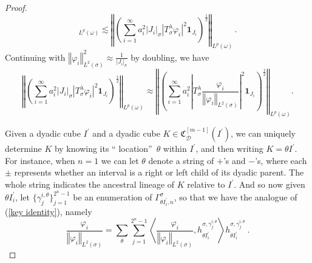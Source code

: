 \documentclass{amsart}%
\theoremstyle{plain}
\numberwithin{equation}{section}
\begin{document}
\begin{proof}
\[_{L^{p}\left(  \omega\right)  }\lesssim\left\Vert \left(  \sum_{i=1}^{\infty
}a_{i}^{2}\left\vert J_{i}\right\vert _{\sigma}\left\vert T_{\sigma}^{\lambda
}\varphi_{i}\right\vert ^{2}\mathbf{1}_{J_{i}}\right)  ^{\frac{1}{2}%
}\right\Vert _{L^{p}\left(  \omega\right)  }\,.
\]
Continuing with $\left\Vert \varphi_{i}\right\Vert _{L^{2}\left(
\sigma\right)  }^{2}\approx\frac{1}{\left\vert J_{i}\right\vert _{\sigma}}$ by
doubling, we have%
\[
\left\Vert \left(  \sum_{i=1}^{\infty}a_{i}^{2}\left\vert J_{i}\right\vert
_{\sigma}\left\vert T_{\sigma}^{\lambda}\varphi_{i}\right\vert ^{2}%
\mathbf{1}_{J_{i}}\right)  ^{\frac{1}{2}}\right\Vert _{L^{p}\left(
\omega\right)  }\approx\left\Vert \left(  \sum_{i=1}^{\infty}a_{i}%
^{2}\left\vert T_{\sigma}^{\lambda}\frac{\varphi_{i}}{\left\Vert \varphi
_{i}\right\Vert _{L^{2}\left(  \sigma\right)  }}\right\vert ^{2}%
\mathbf{1}_{J_{i}}\right)  ^{\frac{1}{2}}\right\Vert _{L^{p}\left(
\omega\right)  }.
\]


Given a dyadic cube $I^{\prime}$ and a dyadic cube $K\in\mathfrak{C}%
_{\mathcal{D}}^{\left[  m-1\right]  }\left(  I^{\prime}\right)  $, we can
uniquely determine $K$ by knowing its \textquotedblleft
location\textquotedblright\ $\theta$ within $I^{\prime}$, and then writing
$K=\theta I^{\prime}$. For instance, when $n=1$ we can let $\theta$ denote a
string of $+$'s and $-$'s, where each $\pm$ represents whether an interval is a right or left child of its dyadic parent. The whole string
indicates the ancestral lineage of $K$ relative to $I^{\prime}$. And so now
given $\theta I_{i}^{\prime}$, let $\{\gamma_{j}^{i,\theta}\}_{j=1}^{2^{n}-1}$
be an enumeration of $\Gamma_{\theta I_{i}^{\prime},n}^{\sigma}$, so that we
have the analogue of (\ref{key identity}), namely
\begin{equation}
\frac{\varphi_{i}}{\left\Vert \varphi_{i}\right\Vert _{L^{2}\left(
\sigma\right)  }}=\sum_{\theta}\sum\limits_{j=1}^{2^{n}-1}\left\langle
\frac{\varphi_{i}}{\left\Vert \varphi_{i}\right\Vert _{L^{2}\left(
\sigma\right)  }},h_{\theta I_{i}^{\prime}}^{\sigma,\gamma_{j}^{i,\theta}%
}\right\rangle h_{\theta I_{i}^{\prime}}^{\sigma,\gamma_{j}^{i,\theta}%
}\ .\label{key identity 2}%
\end{equation}



\end{proof}
\end{document}
